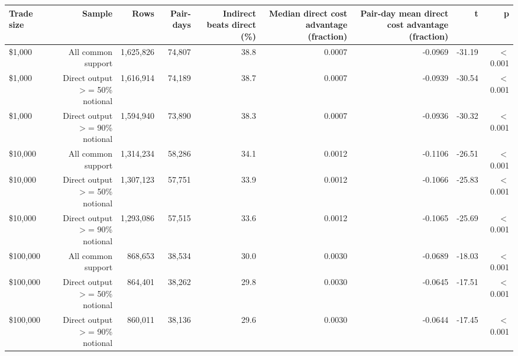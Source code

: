 \begin{tabular}{lrrrrrrrr}
\toprule
Trade size & Sample & Rows & Pair-days & Indirect beats direct (\%) & Median direct cost advantage (fraction) & Pair-day mean direct cost advantage (fraction) & t & p \\
\midrule
\$1,000 & All common support & 1,625,826 & 74,807 & 38.8 & 0.0007 & -0.0969 & -31.19 & \ensuremath{<}0.001 \\
\$1,000 & Direct output \ensuremath{>}= 50\% notional & 1,616,914 & 74,189 & 38.7 & 0.0007 & -0.0939 & -30.54 & \ensuremath{<}0.001 \\
\$1,000 & Direct output \ensuremath{>}= 90\% notional & 1,594,940 & 73,890 & 38.3 & 0.0007 & -0.0936 & -30.32 & \ensuremath{<}0.001 \\
\$10,000 & All common support & 1,314,234 & 58,286 & 34.1 & 0.0012 & -0.1106 & -26.51 & \ensuremath{<}0.001 \\
\$10,000 & Direct output \ensuremath{>}= 50\% notional & 1,307,123 & 57,751 & 33.9 & 0.0012 & -0.1066 & -25.83 & \ensuremath{<}0.001 \\
\$10,000 & Direct output \ensuremath{>}= 90\% notional & 1,293,086 & 57,515 & 33.6 & 0.0012 & -0.1065 & -25.69 & \ensuremath{<}0.001 \\
\$100,000 & All common support & 868,653 & 38,534 & 30.0 & 0.0030 & -0.0689 & -18.03 & \ensuremath{<}0.001 \\
\$100,000 & Direct output \ensuremath{>}= 50\% notional & 864,401 & 38,262 & 29.8 & 0.0030 & -0.0645 & -17.51 & \ensuremath{<}0.001 \\
\$100,000 & Direct output \ensuremath{>}= 90\% notional & 860,011 & 38,136 & 29.6 & 0.0030 & -0.0644 & -17.45 & \ensuremath{<}0.001 \\
\bottomrule
\end{tabular}
